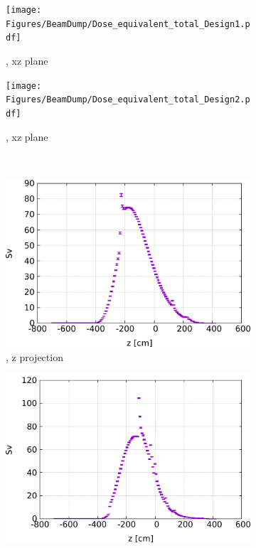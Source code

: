 \begin{figure}[h]
 \centering
  \begin{subfigure}[b]{0.49\textwidth}
   \centering
    \texttt{[image: Figures/BeamDump/Dose\_equivalent\_total\_Design1.pdf]}
   \caption{\designone, xz plane}
   \end{subfigure}
   \hfill
    \begin{subfigure}[b]{0.49\textwidth}
   \centering
    \texttt{[image: Figures/BeamDump/Dose\_equivalent\_total\_Design2.pdf]}
   \caption{\designtwo, xz plane}
   \end{subfigure}\\ \vspace*{0.3cm}
     \begin{subfigure}[b]{0.485\textwidth}
   \centering
    \includegraphics[height=0.24\textheight]{Figures/BeamDump/Dose_equivalent_total_1DMax_z_Design1.png}
   \caption{\designone, z projection}
   \end{subfigure}
   \hfill
    \begin{subfigure}[b]{0.485\textwidth}
   \centering
    \includegraphics[height=0.24\textheight]{Figures/BeamDump/Dose_equivalent_total_1DMax_z_Design2.png}

\end{subfigure}
\end{figure}
